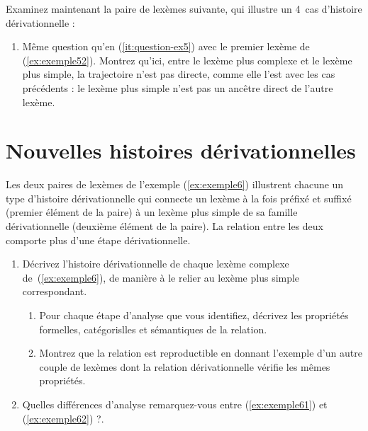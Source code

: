 Examinez maintenant la paire de lexèmes suivante, qui illustre un 4\ieme\ cas d'histoire dérivationnelle :\\

\vspace{-.5\baselineskip}
\begin{exe} 
\ex \label{ex:exemple52} \bitumisationexcinq
\end{exe}


\begin{enumerate}
\item Même question qu'en (\ref{it:question-ex5}) avec le premier lexème de (\ref{ex:exemple52}).  Montrez qu'ici, entre le lexème plus complexe et le lexème plus simple, la trajectoire n'est pas directe, comme elle l'est avec les cas précédents : le lexème plus simple n'est pas un ancêtre direct de l'autre lexème.
\end{enumerate}

\section{Nouvelles histoires dérivationnelles}

Les deux paires de lexèmes de l'exemple (\ref{ex:exemple6})  illustrent chacune un type d'histoire dérivationnelle qui connecte un lexème à la fois préfixé et suffixé  (premier élément de la paire) à un lexème plus simple de sa famille dérivationnelle  (deuxième élément de la paire). La relation entre les deux comporte plus d'une étape dérivationnelle. \\

\vspace{-.5\baselineskip}
\begin{exe}
\ex \label{ex:exemple6}\begin{xlist}
\ex \label{ex:exemple61} \antigrippalexsix
\ex \label{ex:exemple62} \postglaciaireexsix
\end{xlist}
\end{exe}

\begin{enumerate}
\item Décrivez l'histoire dérivationnelle de chaque lexème complexe de~(\ref{ex:exemple6}), de manière à le relier au lexème plus simple correspondant.  
\begin{enumerate}
\item Pour chaque étape d'analyse que vous identifiez, décrivez les propriétés formelles, catégorislles et sémantiques de la relation.
\item Montrez que la relation est reproductible en donnant l'exemple d'un autre couple de lexèmes dont la relation dérivationnelle vérifie les mêmes propriétés.
\end{enumerate}
\item Quelles différences d'analyse remarquez-vous entre (\ref{ex:exemple61}) et (\ref{ex:exemple62}) ?.
\end{enumerate}


